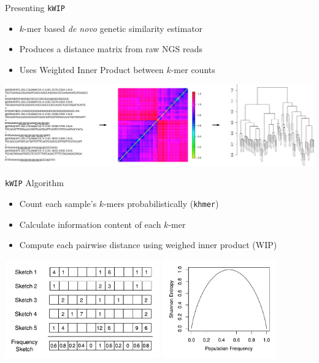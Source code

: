 \documentclass[t]{beamer}
\begin{document}
\begin{frame}{Presenting \texttt{kWIP}}
  \begin{itemize}
    \item $k$-mer based \textit{de novo} genetic similarity estimator
    \item Produces a distance matrix from raw NGS reads
    \item Uses Weighted Inner Product between $k$-mer counts
  \end{itemize}
  \begin{center}
    \includegraphics[width=\textwidth]{img/kwip-overview.png}
  \end{center}
\end{frame}

\begin{frame}{\texttt{kWIP} Algorithm}
  \begin{itemize}
    \item Count each sample's $k$-mers probabilistically (\texttt{khmer})
    \item Calculate information content of each $k$-mer
    \item Compute each pairwise distance using weighed inner product (WIP)
  \end{itemize}
  \begin{center}
    \includegraphics[width=0.5\textwidth]{img/sketch_aggregation.pdf}
    \includegraphics[width=0.37\textwidth]{img/shanent.pdf}
  \end{center}
\end{frame}
\end{document}
